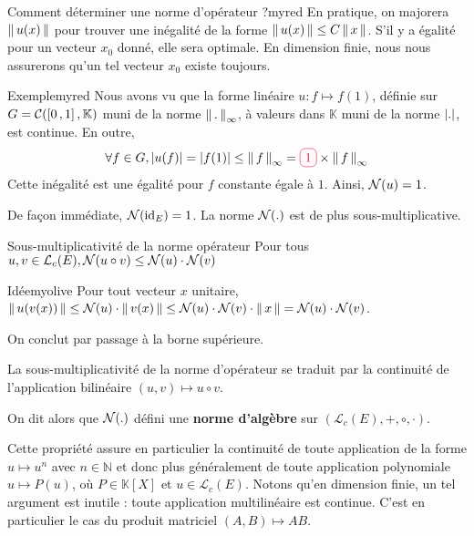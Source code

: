     \begin{omed}{Comment déterminer une norme d’opérateur ?}{myred}
        En pratique, on majorera $\left\lVert\,u(x)\,\right\rVert$ pour trouver une inégalité de la forme $\left\lVert\,u(x)\,\right\rVert \leq C \left\lVert\,x\,\right\rVert$. S’il y a égalité pour un vecteur $x_0$ donné, elle sera optimale. En dimension finie, nous nous assurerons qu’un tel vecteur $x_0$ existe toujours.
    \end{omed}

    \begin{omed}{Exemple}{myred}
        Nous avons vu que la forme linéaire $u : f \mapsto f(1)$, définie sur $G = \mathcal{C}(\left[ 0 \, , 1 \right],\mathbb{K})$ muni de la norme $\left\lVert\,.\,\right\rVert_{\infty}$, à valeurs dans $\mathbb{K}$ muni de la norme $\left\lvert .\right\rvert$, est continue. En outre,
        \[ \forall f \in G, \abs{u(f)} = \abs{f(1)} \leq \norm{f}_{\infty} = \lilbox{myred}{$1$} \times \norm{f}_{\infty} \]
        Cette inégalité est une égalité pour $f$ constante égale à $1$. Ainsi, $\mathcal{N}(u) = 1$.
    \end{omed}

    De façon immédiate, $\mathcal{N}(\operatorname{id}_E) = 1$. La norme $\mathcal{N}(.)$ est de plus sous-multiplicative.

    \begin{prop}{Sous-multiplicativité de la norme opérateur}{}
        Pour tous $u,v \in \mathcal{L}_c(E), \mathcal{N}(u \circ v) \leq \mathcal{N}(u) \cdot \mathcal{N}(v)$
    \end{prop}

    \begin{demo}{Idée}{myolive}
        Pour tout vecteur $x$ unitaire, $\left\lVert\,u(v(x))\,\right\rVert \leq \mathcal{N}(u) \cdot \left\lVert\,v(x)\,\right\rVert \leq \mathcal{N}(u) \cdot \mathcal{N}(v) \cdot \left\lVert\,x\,\right\rVert = \mathcal{N}(u) \cdot \mathcal{N}(v)$.

        On conclut par passage à la borne supérieure.
    \end{demo}

    La sous-multiplicativité de la norme d’opérateur se traduit par la continuité de l’application bilinéaire $(u,v) \longmapsto u \circ v$. 

    On dit alors que $\mathcal{N}(.)$ défini une \textbf{norme d’algèbre} sur $\left(\mathcal{L}_c(E), +, \circ, \cdot\right)$.

    Cette propriété assure en particulier la continuité de toute application de la forme $u \mapsto u^n$ avec $n \in \mathbb{N}$ et donc plus généralement de toute application polynomiale $u \mapsto P(u)$, où $P \in \mathbb{K}[X]$ et $u \in \mathcal{L}_c(E)$. Notons qu’en dimension finie, un tel argument est inutile : toute application multilinéaire est continue. C’est en particulier le cas du produit matriciel $(A,B) \mapsto AB$. 

